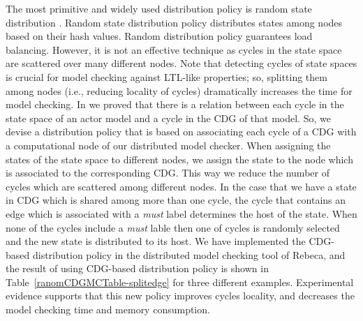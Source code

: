 The most primitive and widely used distribution policy is random state distribution \cite{DBLP:journals/entcs/GaravelMS13}. Random state distribution policy distributes states among nodes based on their hash values. Random distribution policy guarantees load balancing. However, it is not an effective technique as cycles in the state space are scattered over many different nodes. Note that detecting cycles of state spaces is crucial for model checking against LTL-like properties; so, splitting them among nodes (i.e., reducing locality of cycles) dramatically increases the time for model checking. %
%
In \cite{DBLP:journals/eceasst/KhamespanahSMSR15} we proved that there is a relation between each cycle in the state space of an actor model 
and a cycle in the CDG of that model.
So, we devise a distribution policy that is based on
associating each cycle of a CDG with a computational node of our distributed model checker. When assigning the states of the state space to different nodes, we assign the state to the node which is associated to the corresponding CDG. This way we reduce the number of cycles which are scattered among different nodes.
%
In the case that we have a state in CDG  which is shared among more than one cycle, the cycle that contains an edge which is associated with a \emph{must} label determines the host of the state. 
%
When none of the cycles include a \emph{must} lable then one of  cycles is randomly selected and the new state is distributed to its host. 
%
We have implemented the CDG-based distribution policy in the distributed model checking tool of Rebeca, and the result of using CDG-based distribution policy is shown in Table~\ref{ranomCDGMCTable-splitedge} for three different examples. Experimental evidence supports that this new policy improves cycles locality, and decreases the model checking time and memory consumption. %

